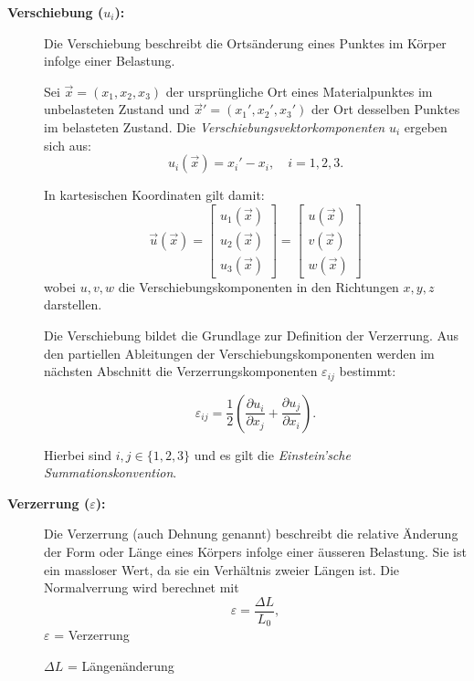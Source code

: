 \begin{description}
\item[\textbf{Verschiebung ($u_i$):}] Die Verschiebung beschreibt die Ortsänderung eines Punktes im Körper infolge einer Belastung.

Sei $\vec{x} = (x_1, x_2, x_3)$ der ursprüngliche Ort eines Materialpunktes im unbelasteten Zustand und $\vec{x}' = (x_1', x_2', x_3')$ der Ort desselben Punktes im belasteten Zustand.  
Die \emph{Verschiebungsvektorkomponenten} $u_i$ ergeben sich aus:
\begin{equation}
	u_i(\vec{x}) = x_i' - x_i,
	\quad i = 1,2,3.
\end{equation}

In kartesischen Koordinaten gilt damit:
\[
\vec{u}(\vec{x}) =
\begin{bmatrix}
	u_1(\vec{x}) \\
	u_2(\vec{x}) \\
	u_3(\vec{x})
\end{bmatrix}
=
\begin{bmatrix}
	u(\vec{x}) \\
	v(\vec{x}) \\
	w(\vec{x})
\end{bmatrix}
\]
wobei $u, v, w$ die Verschiebungskomponenten in den Richtungen $x, y, z$ darstellen.

Die Verschiebung bildet die Grundlage zur Definition der Verzerrung. 
Aus den partiellen Ableitungen der Verschiebungskomponenten werden im nächsten Abschnitt die Verzerrungskomponenten $\varepsilon_{ij}$ bestimmt:

\begin{equation}
	\varepsilon_{ij} = \frac{1}{2}
	\left(
	\frac{\partial u_i}{\partial x_j}
	+
	\frac{\partial u_j}{\partial x_i}
	\right).
\end{equation}

Hierbei sind $i,j \in \{1,2,3\}$ und es gilt die \emph{Einstein’sche Summationskonvention}.

\item[\textbf{Verzerrung ($\varepsilon$):}] Die Verzerrung (auch Dehnung genannt) beschreibt die relative Änderung der Form oder Länge eines Körpers infolge einer äusseren Belastung. 
Sie ist ein massloser Wert, da sie ein Verhältnis zweier Längen ist.
Die Normalverrung wird berechnet mit
	\begin{equation}
		\varepsilon 
		= \frac{\Delta L}{L_0},
	\end{equation}
	$\varepsilon$ = Verzerrung
	
	$\Delta L$ = Längenänderung
	

\end{description}
